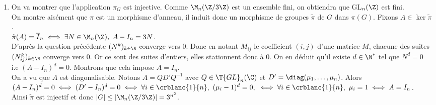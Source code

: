 \documentclass[8pt]{book}
\begin{document}
\begin{enumerate}
\begin{enumerate}[label=\alph*.]
			\item On va montrer que l'application $\pi_G$ est injective. Comme $\M_n(\Z/3\Z)$ est un ensemble fini, on obtiendra que GL$_n(\Z)$ est fini.\\
			On montre aisément que $\pi$ est un morphisme d'anneau, il induit donc un morphisme de groupes $\tilde \pi$ de $G$ dans $\pi(G)$. Fixons $A\in \ker\tilde\pi$.\\
			$\tilde\pi(A)=\overline I_n\iff \exists N\in \M_n(\Z),\ A-I_n=3N$.\\
			D'après la question précédente $(N^k)_{k\in \N}$ converge vers $0$. Donc en notant $M_{ij}$ le coefficient $(i,j)$ d'une matrice $M$, chacune des suites $(N^k_{ij})_{k\in \N}$ converge vers $0$. Or ce sont des suites d'entiers, elles stationnent donc à $0$. On en déduit qu'il existe $d\in \N^*$ tel que $N^d=0$ i.e $(A-I_n)^d=0$. Montrons que cela impose $A=I_n$.\\
			On a vu que $A$ est diagonalisable. Notons $A=QD'Q^{-1}$ avec $Q\in \T{GL}_n(\C)$ et $D'=\diag(\mu_1,\dots,\mu_n)$. Alors $(A-I_n)^d=0\iff (D'-I_n)^d=0\iff \forall i\in \crblanc{1}{n},\ (\mu_i-1)^d=0,\ \iff \forall i\in \crblanc{1}{n},\ \mu_i=1\iff A=I_n$.\\
			Ainsi $\tilde\pi$ est injectif et donc $|G|\leq \left|\M_n(\Z/3\Z)\right|=3^{n^2}$.
		\end{enumerate}
	\end{enumerate}
	
\end{document}
